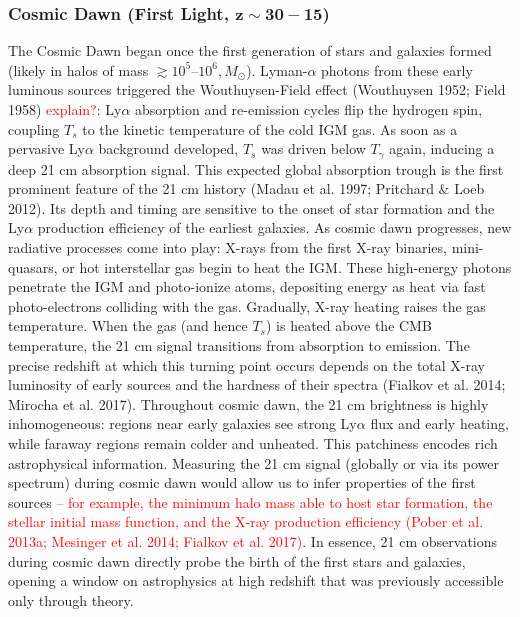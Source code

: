 \documentclass[floats,floatfix,showpacs,amssymb,prd,superscriptaddress,nofootinbib]{revtex4-2} %
\newcommand{\red}{\textcolor{red}}
\begin{document}
\subsubsection{Cosmic Dawn (First Light, $\mathbf{z \sim 30-15}$)}
The Cosmic Dawn began once the first generation of stars and galaxies formed (likely in halos of mass $\gtrsim10^5$–$10^6,M_\odot$). Lyman-$\alpha$ photons from these early luminous sources triggered the Wouthuysen-Field effect (Wouthuysen 1952; Field 1958) \red{explain?}: Ly$\alpha$ absorption and re-emission cycles flip the hydrogen spin, coupling $T_s$ to the kinetic temperature of the cold IGM gas. As soon as a pervasive Ly$\alpha$ background developed, $T_s$ was driven below $T_\gamma$ again, inducing a deep 21 cm absorption signal. This expected global absorption trough is the first prominent feature of the 21 cm history (Madau et al. 1997; Pritchard \& Loeb 2012). Its depth and timing are sensitive to the onset of star formation and the Ly$\alpha$ production efficiency of the earliest galaxies. As cosmic dawn progresses, new radiative processes come into play: X-rays from the first X-ray binaries, mini-quasars, or hot interstellar gas begin to heat the IGM. These high-energy photons penetrate the IGM and photo-ionize atoms, depositing energy as heat via fast photo-electrons colliding with the gas. Gradually, X-ray heating raises the gas temperature. When the gas (and hence $T_s$) is heated above the CMB temperature, the 21 cm signal transitions from absorption to emission. The precise redshift at which this turning point occurs depends on the total X-ray luminosity of early sources and the hardness of their spectra (Fialkov et al. 2014; Mirocha et al. 2017). Throughout cosmic dawn, the 21 cm brightness is highly inhomogeneous: regions near early galaxies see strong Ly$\alpha$ flux and early heating, while faraway regions remain colder and unheated. This patchiness encodes rich astrophysical information. Measuring the 21 cm signal (globally or via its power spectrum) during cosmic dawn would allow us to infer properties of the first sources \red{– for example, the minimum halo mass able to host star formation, the stellar initial mass function, and the X-ray production efficiency (Pober et al. 2013a; Mesinger et al. 2014; Fialkov et al. 2017)}. In essence, 21 cm observations during cosmic dawn directly probe the birth of the first stars and galaxies, opening a window on astrophysics at high redshift that was previously accessible only through theory.
\end{document}
